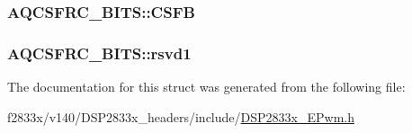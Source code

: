 \subsubsection[{C\+S\+F\+B}]{ A\+Q\+C\+S\+F\+R\+C\+\_\+\+B\+I\+T\+S\+::\+C\+S\+F\+B}\label{struct_a_q_c_s_f_r_c___b_i_t_s_aa24b9e006ae4e4ce2a7167e470cb9e15}
\hypertarget{struct_a_q_c_s_f_r_c___b_i_t_s_aa9fe8f62c165ed323c1b94b6836a6689}{}
\subsubsection[{rsvd1}]{ A\+Q\+C\+S\+F\+R\+C\+\_\+\+B\+I\+T\+S\+::rsvd1}\label{struct_a_q_c_s_f_r_c___b_i_t_s_aa9fe8f62c165ed323c1b94b6836a6689}


The documentation for this struct was generated from the following file\+:\begin{DoxyCompactItemize}
\item 
f2833x/v140/\+D\+S\+P2833x\+\_\+headers/include/\hyperlink{_d_s_p2833x___e_pwm_8h}{D\+S\+P2833x\+\_\+\+E\+Pwm.\+h}\end{DoxyCompactItemize}
